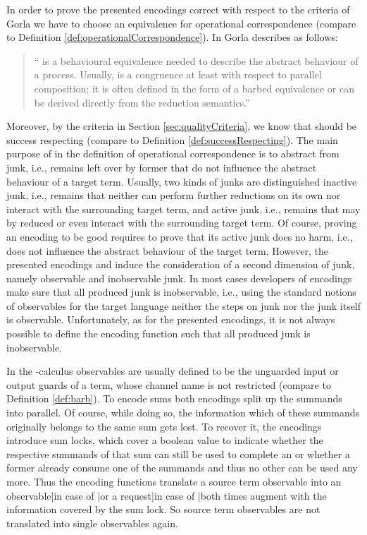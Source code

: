 \documentclass[]{llncs}
\begin{document}
In order to prove the presented encodings correct with respect to the criteria of Gorla we have to choose an equivalence  for operational correspondence (compare to Definition \ref{def:operationalCorrespondence}). In \cite{gorla10} Gorla describes  as follows:
\begin{quotation}
	`` is a behavioural equivalence needed to describe the abstract behaviour of a process. Usually,  is a congruence at least with respect to parallel composition; it is often defined in the form of a barbed equivalence or can be derived directly from the reduction semantics.''
\end{quotation}
Moreover, by the criteria in Section \ref{sec:qualityCriteria}, we know that  should be success respecting (compare to Definition \ref{def:successRespecting}). The main purpose of  in the definition of operational correspondence is to abstract from junk, i.e., remains left over by former \simulations that do not influence the abstract behaviour of a target term. Usually, two kinds of junks are distinguished inactive junk, i.e., remains that neither can perform further reductions on its own nor interact with the surrounding target term, and active junk, i.e., remains that may by reduced or even interact with the surrounding target term. Of course, proving an encoding to be good requires to prove that its active junk does no harm, i.e., does not influence the abstract behaviour of the target term. However, the presented encodings  and  induce the consideration of a second dimension of junk, namely observable and inobservable junk. In most cases developers of encodings make sure that all produced junk is inobservable, i.e., using the standard notions of observables for the target language neither the steps on junk nor the junk itself is observable. Unfortunately, as for the presented encodings, it is not always possible to define the encoding function such that all produced junk is inobservable.

In the \piCal-calculus observables are usually defined to be the unguarded input or output guards of a term, whose channel name is not restricted (compare to Definition \ref{def:barb}). To encode sums both encodings split up the summands into parallel. Of course, while doing so, the information which of these summands originally belongs to the same sum gets lost. To recover it, the encodings introduce sum locks, which cover a boolean value to indicate whether the respective summands of that sum can still be used to complete an \simulation or whether a former \simulation already consume one of the summands and thus no other can be used any more. Thus the encoding functions translate a source term observable into an observable|in case of |or a request|in case of |both times augment with the information covered by the sum lock. So source term observables are not translated into single observables again.
\end{document}

